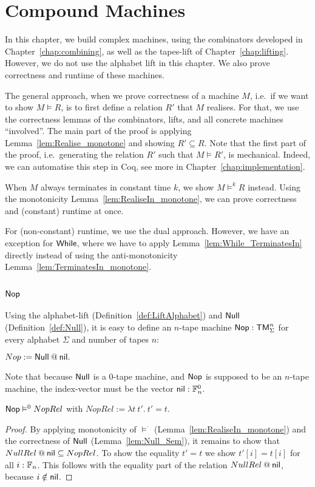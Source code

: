 \chapter{Compound Machines}
\label{cha:compound}

In this chapter, we build complex machines, using the combinators developed in Chapter~\ref{chap:combining}, as well as the tapes-lift of
Chapter~\ref{chap:lifting}.  However, we do not use the alphabet lift in this chapter.  We also prove correctness and runtime of these machines.

The general approach, when we prove correctness of a machine $M$, i.e.\ if we want to show $M \vDash R$, is to first define a relation $R'$ that $M$
realises.  For that, we use the correctness lemmas of the combinators, lifts, and all concrete machines ``involved''.  The main part of the proof is
applying Lemma~\ref{lem:Realise_monotone} and showing $R' \subseteq R$.  Note that the first part of the proof, i.e.\ generating the relation $R'$
such that $M \vDash R'$, is mechanical.  Indeed, we can automatise this step in Coq, see more in Chapter~\ref{chap:implementation}.

When $M$ always terminates in constant time $k$, we show $M \vDash^k R$ instead.  Using the monotonicity Lemma~\ref{lem:RealiseIn_monotone}, we can
prove correctness and (constant) runtime at once.

For (non-constant) runtime, we use the dual approach.  However, we have an exception for $\textsf{While}$, where we have to apply
Lemma~\ref{lem:While_TerminatesIn} directly instead of using the anti-monotonicity Lemma~\ref{lem:TerminatesIn_monotone}.

\section{$\Nop$}
\label{sec:Nop}

Using the alphabet-lift (Definition~\ref{def:LiftAlphabet}) and $\textsf{Null}$ (Definition~\ref{def:Null}), it is easy to define an $n$-tape machine
$\textsf{Nop} : \textsf{TM}_\Sigma^n$ for every alphabet $\Sigma$ and number of tapes $n$:
\begin{definition}[$\Nop$]
  $Nop := \textsf{Null} \mathbin{@} \textsf{nil}.$
\end{definition}
Note that because $\textsf{Null}$ is a 0-tape machine, and $\Nop$ is supposed to be an $n$-tape machine, the index-vector must be the vector
$\textsf{nil} : \mathbb{F}_n^0$.

\begin{lemma}
  \label{lem:Nop_Sem}
  $\textsf{Nop} \vDash^0 NopRel$ with $NopRel := \lambda t~t'.~t'=t$.
\end{lemma}
\begin{proof}
  By applying monotonicity of $\vDash^\cdot$ (Lemma~\ref{lem:RealiseIn_monotone}) and the correctness of $\textsf{Null}$ (Lemma~\ref{lem:Null_Sem}), it
  remains to show that $NullRel \mathbin{@} \textsf{nil} \subseteq NopRel$.  To show the equality $t'=t$ we show $t'[i]=t[i]$ for all $i:\mathbb{F}_n$.  This
  follows with the equality part of the relation $NullRel \mathbin{@} \textsf{nil}$, because $i \notin \textsf{nil}$.
\end{proof}

